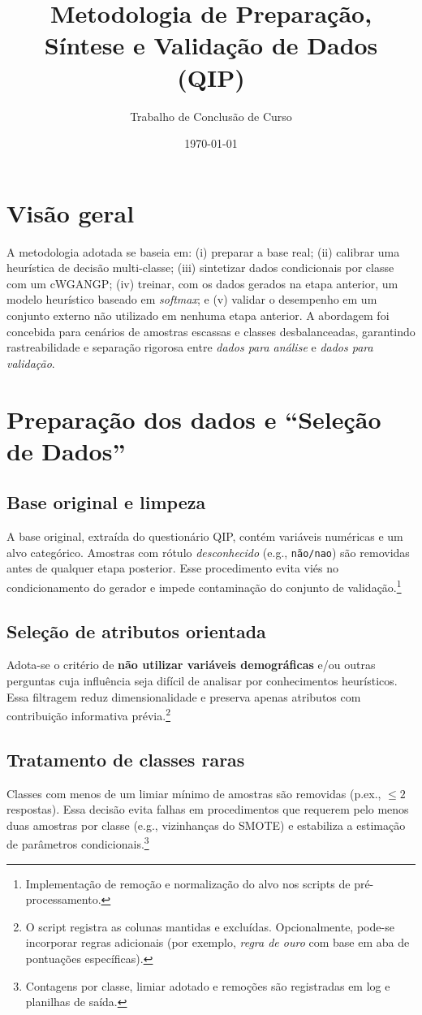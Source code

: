\documentclass[12pt,a4paper]{article}
\title{\textbf{Metodologia de Preparação, Síntese e Validação de Dados (QIP)}}
\author{Trabalho de Conclusão de Curso}
\date{\today}
\begin{document}
\maketitle

\section{Visão geral}
A metodologia adotada se baseia em: (i) preparar a base real; (ii) calibrar uma heurística de decisão multi-classe; (iii) sintetizar dados condicionais por classe com um cWGAN\textendash GP; (iv) treinar, com os dados gerados na etapa anterior, um modelo heurístico baseado em \emph{softmax}; e (v) validar o desempenho em um conjunto externo não utilizado em nenhuma etapa anterior. A abordagem foi concebida para cenários de amostras escassas e classes desbalanceadas, garantindo rastreabilidade e separação rigorosa entre \emph{dados para análise} e \emph{dados para validação}.

\section{Preparação dos dados e ``Seleção de Dados''}
\subsection{Base original e limpeza}
A base original, extraída do questionário QIP, contém variáveis numéricas e um alvo categórico. Amostras com rótulo \emph{desconhecido} (e.g., \texttt{não/nao}) são removidas antes de qualquer etapa posterior. Esse procedimento evita viés no condicionamento do gerador e impede contaminação do conjunto de validação.\footnote{Implementação de remoção e normalização do alvo nos scripts de pré-processamento.}

\subsection{Seleção de atributos orientada}
Adota-se o critério de \textbf{não utilizar variáveis demográficas} e/ou outras perguntas cuja influência seja difícil de analisar por conhecimentos heurísticos. Essa filtragem reduz dimensionalidade e preserva apenas atributos com contribuição informativa prévia.\footnote{O script registra as colunas mantidas e excluídas. Opcionalmente, pode-se incorporar regras adicionais (por exemplo, \emph{regra de ouro} com base em aba de pontuações específicas).}

\subsection{Tratamento de classes raras}
Classes com menos de um limiar mínimo de amostras são removidas (p.ex., $\leq 2$ respostas). Essa decisão evita falhas em procedimentos que requerem pelo menos duas amostras por classe (e.g., vizinhanças do SMOTE) e estabiliza a estimação de parâmetros condicionais.\footnote{Contagens por classe, limiar adotado e remoções são registradas em log e planilhas de saída.}
\end{document}
